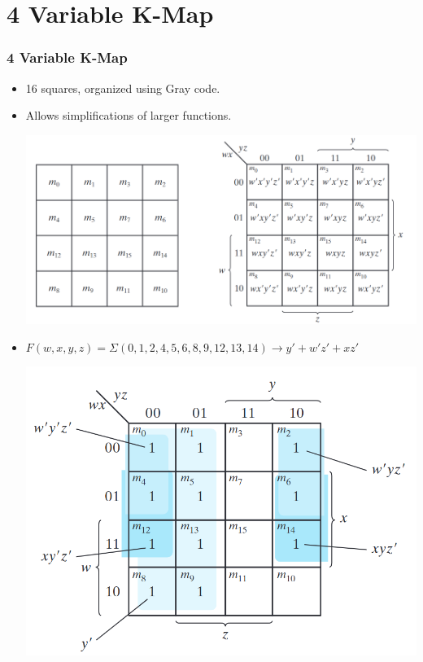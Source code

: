 \documentclass[Serif, 10pt, brown]{beamer}
\theoremstyle{example}
\theoremstyle{plain}
\begin{document}
\section[4 Variable K-Map]{4 Variable K-Map }
\begin{frame}
	\frametitle{4 Variable K-Map }
	\transfly
	 \begin{itemize}
        \item 16 squares, organized using Gray code.
        \item Allows simplifications of larger functions.
    
    \begin{center}
        \includegraphics[width=0.625\linewidth]{figs/4var.png}
    \end{center}
    \item \( F(w,x,y,z) = \Sigma(0,1,2,4,5,6,8,9,12,13,14) \rightarrow y' + w' z' + x z' \)
    \begin{center}
        \includegraphics[width=0.5\linewidth]{figs/4ex.png}
    \end{center}
    \end{itemize}
\end{frame}
\end{document}
